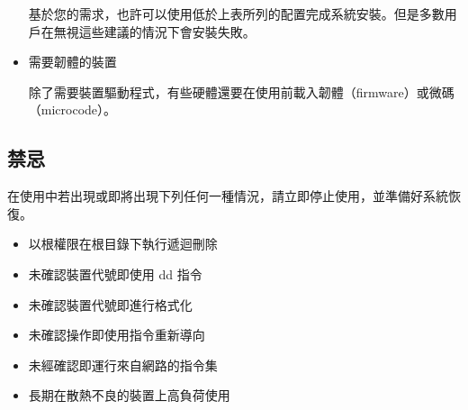 \documentclass[UTF8]{article}
\begin{document}
\begin{multicols*}{3}
\begin{itemize}[leftmargin=*]
		基於您的需求，也許可以使用低於上表所列的配置完成系統安裝。但是多數用戶在無視這些建議的情況下會安裝失敗。

		\item 需要韌體的裝置

		除了需要裝置驅動程式，有些硬體還要在使用前載入韌體（firmware）或微碼（microcode）。

	\end{itemize}


	\begin{tcolorbox}
	\section*{禁忌}
	\end{tcolorbox}

	在使用中若出現或即將出現下列任何一種情況，請立即停止使用，並準備好系統恢復。

	\begin{itemize}[leftmargin=*]
		\setlength{\itemsep}{0pt}
		\setlength{\parskip}{0pt}
		\setlength{\parsep}{0pt}

		\item 以根權限在根目錄下執行遞迴刪除
		\item 未確認裝置代號即使用 dd 指令
		\item 未確認裝置代號即進行格式化
		\item 未確認操作即使用指令重新導向
		\item 未經確認即運行來自網路的指令集
		\item 長期在散熱不良的裝置上高負荷使用
	\end{itemize}


	 





\end{multicols*}
\end{document}
